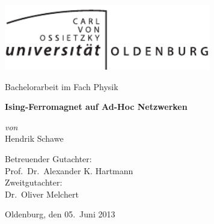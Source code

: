 \begin{titlepage}
\begin{center}

\includegraphics[width=90mm]{images/Uniol_1c.pdf}\\
\vspace{25mm}

{\LARGE  Bachelorarbeit im Fach Physik\\}

\vspace{10mm}

{\LARGE \bfseries
Ising-Ferromagnet auf Ad-Hoc Netzwerken
\\}

\vspace{20mm}

\begin{minipage}{0.4\textwidth}
\begin{center} \large
\emph{von}\\
\large
Hendrik Schawe\\
\end{center}
\end{minipage}

\vspace{45mm}

{\large
Betreuender Gutachter:\\
Prof.\ Dr.\ Alexander K. Hartmann\\
}
\vspace{8mm}
{\large
Zweitgutachter:\\
Dr.\ Oliver Melchert\\
}

\vfill
{\large Oldenburg, den 05.\ Juni 2013}
\newpage

\end{center}

\end{titlepage}
